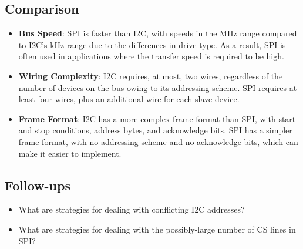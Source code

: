 \documentclass[main.tex]{subfiles}
\begin{document}
\subsection{Comparison}
\begin{itemize}
    \item \textbf{Bus Speed}: SPI is faster than I2C, with speeds in the MHz range compared to I2C's kHz range due to the differences in drive type. As a result, SPI is often used in applications where the transfer speed is required to be high.
    \item \textbf{Wiring Complexity}: I2C requires, at most, two wires, regardless of the number of devices on the bus owing to its addressing scheme. SPI requires at least four wires, plus an additional wire for each slave device.
    \item \textbf{Frame Format}: I2C has a more complex frame format than SPI, with start and stop conditions, address bytes, and acknowledge bits. SPI has a simpler frame format, with no addressing scheme and no acknowledge bits, which can make it easier to implement.
\end{itemize}

\subsection{Follow-ups}
\begin{itemize}
    \item What are strategies for dealing with conflicting I2C addresses?
    \item What are strategies for dealing with the possibly-large number of CS lines in SPI?
\end{itemize}
\end{document}
